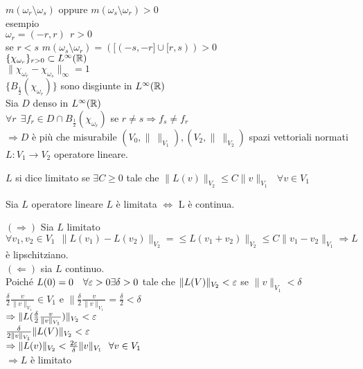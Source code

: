 \documentclass[12px]{article}
\begin{document}
	  $m(\omega_r\setminus \omega_s)$ oppure  $m(\omega_s\setminus \omega_r) > 0 $ \\
	  esempio\\
	   $\omega_r = (-r, r) \ \ r > 0 $\\
	   se  $r < s$  $m(\omega_s\setminus\omega_r) = ([(-s,-r] \cup [r,s)) > 0 $ \\
	   $\{\chi_{\omega_r}\}_{r > 0 }\subset L^\infty(\mathbb{R})$\\
	   $\|\chi_{\omega_r} - \chi_{\omega_s}\|_\infty  = 1$\\
   $\{B_{\frac 12}(\chi_{\omega_r})\}$ sono disgiunte in  $L^\infty (\mathbb{R})$\\
   Sia  $D$ denso in $L^\infty(\mathbb{R})$\\
   $\forall r \ \ \exists f_r\in D\cap B_{\frac 12} (\chi_{\omega_r})$ se  $r\neq s \Rightarrow f_s \neq f_r$ \\
   $ \Rightarrow  D $ è più che misurabile
   $(V_0, \|\ \|_{V_1}), (V_2, \|\ \|_{V_2})$  spazi vettoriali normati\\
   $L: V_1 \rightarrow V_2$ operatore lineare.\\
   \begin{defi}
	   $L$ si dice limitato se $\exists C \geq 0$ tale che  $\| L(v)\|_{V_2} \leq C\|v\|_{V_1} \ \ \ \forall v\in V_1$
   \end{defi}
   \begin{teo}
   	Sia $L$ operatore lineare $L$ è limitata $ \Leftrightarrow$ L è continua.
   \end{teo}
   \begin{dimo}
	   $ ( \Rightarrow )$ Sia $L$ limitato $\forall v_1,v_2\in V_1\ \ \|L(v_1)- L(v_2)\|_{V_2} = \leq L(v_1+v_2)\|_{V_2} \leq C\|v_1 - v_2\|_{V_1} \Rightarrow  L $  è lipschitziano.\\
	   $ ( \Leftarrow )$ sia  $L$ continuo.\\ 
	   Poiché $L(0) = 0\ \ \ \forall \varepsilon > 0 \exists\delta > 0$ tale che  $\|L(V)\|_{V_2} < \varepsilon$ se $\|v\|_{V_1} < \delta$\\
   $\frac \delta 2 \frac {v}{\|v\|_{V_1}}\in V_1$ e $\|\frac \delta 2\frac {v}{\|v\|_{V_1}} = \frac \delta 2 < \delta$\\
   $ \Rightarrow  \|L(\frac\delta 2 \frac v {\|v\|_{V_1}})\|_{V_2} < \varepsilon$ \\
   $\frac \delta {2\|v\|_{V_1}}\|L(V)\|_{V_2} < \varepsilon$\\
   $ \Rightarrow  \|L(v)\|_{V_2} < \frac {2\varepsilon} \delta\|v\|_{V_1} \ \ \forall v\in V_1$\\
   $ \Rightarrow  L $ è limitato
   \end{dimo}
\end{document}
